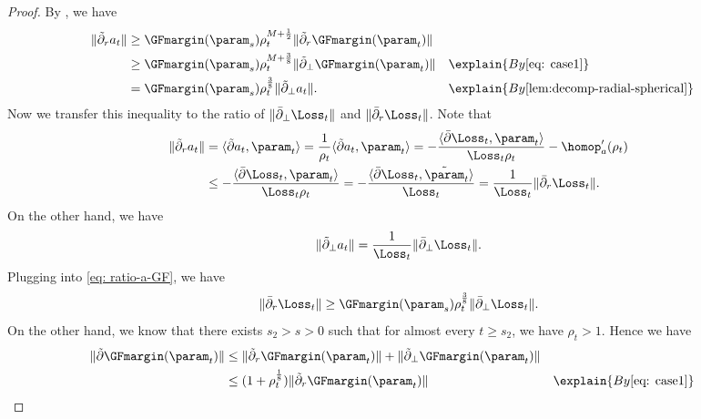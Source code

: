\begin{proof}
By , we have 
\begin{align}
    \label{eq: ratio-a-GF}
    \| \tilde \partial_r a_t \| 
    &\ge \GFmargin(\param_s) \rho_t^{M+\frac{1}{2}} \| \tilde \partial_r \GFmargin(\param_t) \|  \notag\\
    &\ge \GFmargin(\param_s) \rho_t^{M + \frac{3}{8}} \| \tilde \partial_\perp \GFmargin(\param_t)\| &&\explain{ By \Cref{eq: case1}} \notag \\ 
    &= \GFmargin(\param_s) \rho_t^{\frac{3}{8}} \| \tilde \partial_\perp a_t\|. &&\explain{ By \Cref{lem:decomp-radial-spherical}} 
\end{align}
Now we transfer this inequality to the ratio of $\| \bar \partial_\perp \Loss_t\|$ and $\| \bar \partial_r \Loss_t\|$.  Note that 
\begin{align}
\| \tilde \partial_r a_t \| 
& = \langle \tilde \partial a_t, \param_t \rangle 
=\frac{1}{\rho_t} \langle \tilde \partial a_t, \param_t \rangle 
= -\frac{\langle \bar  \partial \Loss_t, \param_t \rangle }{\Loss_t \rho_t} - \homop_a^\prime (\rho_t)  
\notag \\ 
& \le -\frac{\langle \bar \partial \Loss_t, \param_t \rangle }{\Loss_t \rho_t} 
= -\frac{\langle \bar \partial \Loss_t, \tilde \param_t \rangle }{\Loss_t} 
= \frac{1}{\Loss_t} \| \bar \partial_r \Loss_t\|. 
\label{eq:ratio-ra-rL}
\end{align}
On the other hand, we have 
\begin{equation}
\label{eq:ratio-ta-tL}
    \| \tilde \partial_\perp a_t \| = \frac{1}{\Loss_t} \| \bar \partial_\perp \Loss_t\|.
\end{equation}
Plugging  into \eqref{eq: ratio-a-GF}, we have 
\begin{equation}
\label{eq: ratio-L-GF}
        \| \bar \partial_r \Loss_t\| \ge \GFmargin(\param_s)\rho_t^{\frac{3}{8}} \| \bar \partial_\perp \Loss_t\|.
\end{equation}
On the other hand, we know that there exists $s_2>s>0$ such that for almost every $t\ge s_2$, we have $\rho_t >1$.  Hence we have 
\begin{align}
\label{eq: gamma_rad-GF}
\| \tilde  \partial \GFmargin (\param_t) \| 
&\le  \| \tilde \partial_r \GFmargin(\param_t) \| + \| \tilde \partial_\perp \GFmargin(\param_t) \|
\notag\\ 
& \le (1+\rho_t^{\frac{1}{8}} ) \| \tilde \partial_r \GFmargin(\param_t) \|
&&\explain{ By \Cref{eq: case1}}  
\notag\\   

\end{align}
\end{proof}

